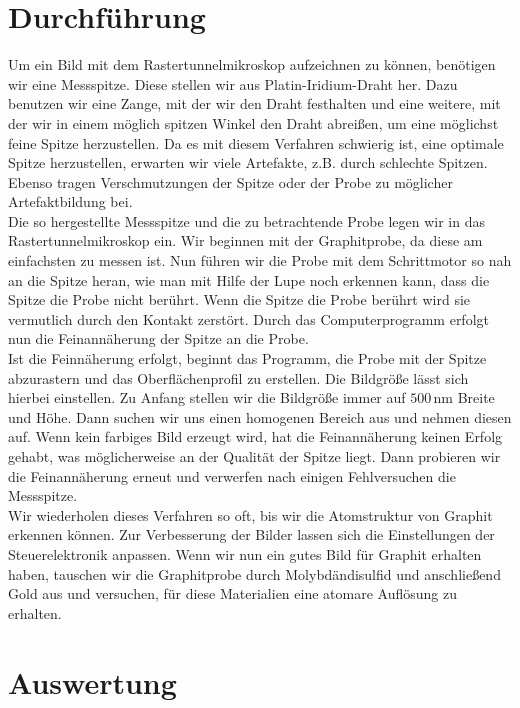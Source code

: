 \documentclass[12pt,listof=totoc]{scrartcl}
\begin{document}
\newpage
\section{Durchführung}\label{durchfuehrung}
Um ein Bild mit dem Rastertunnelmikroskop aufzeichnen zu können, benötigen wir eine Messspitze. Diese stellen wir aus Platin-Iridium-Draht her. Dazu benutzen wir eine Zange, mit der wir den Draht festhalten und eine weitere, mit der wir in einem möglich spitzen Winkel den Draht abreißen, um eine möglichst feine Spitze herzustellen. Da es mit diesem Verfahren schwierig ist, eine optimale Spitze herzustellen, erwarten wir viele Artefakte, z.B. durch schlechte Spitzen. Ebenso tragen Verschmutzungen der Spitze oder der Probe zu möglicher Artefaktbildung bei.\\

Die so hergestellte Messspitze und die zu betrachtende Probe legen wir in das Rastertunnelmikroskop ein. Wir beginnen mit der Graphitprobe, da diese am einfachsten zu messen ist. Nun führen wir die Probe mit dem Schrittmotor so nah an die Spitze heran, wie man mit Hilfe der Lupe noch erkennen kann, dass die Spitze die Probe nicht berührt. Wenn die Spitze die Probe berührt wird sie vermutlich durch den Kontakt zerstört. Durch das Computerprogramm erfolgt nun die Feinannäherung der Spitze an die Probe. \\

Ist die Feinnäherung erfolgt, beginnt das Programm, die Probe mit der Spitze abzurastern und das Oberflächenprofil zu erstellen. Die Bildgröße lässt sich hierbei einstellen. Zu Anfang stellen wir die Bildgröße immer auf $500\,$nm Breite und Höhe. Dann suchen wir uns einen homogenen Bereich  aus und nehmen diesen auf. Wenn kein farbiges Bild erzeugt wird, hat die Feinannäherung keinen Erfolg gehabt, was möglicherweise an der Qualität der Spitze liegt. Dann probieren wir die Feinannäherung erneut und verwerfen nach einigen Fehlversuchen die Messspitze.\\

Wir wiederholen dieses Verfahren so oft, bis wir die Atomstruktur von Graphit erkennen können. Zur Verbesserung der Bilder lassen sich die Einstellungen der Steuerelektronik anpassen. Wenn wir nun ein gutes Bild für Graphit erhalten haben, tauschen wir die Graphitprobe durch Molybdändisulfid und anschließend Gold aus und versuchen, für diese Materialien eine atomare Auflösung zu erhalten.
\newpage
\section{Auswertung}
\end{document}
